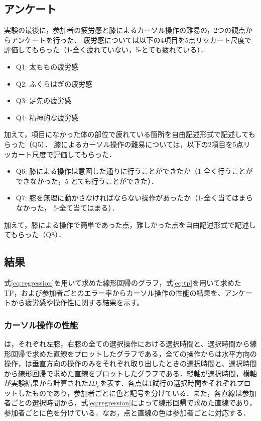 \documentclass[submit, techrep]{ipsj}
\begin{document}
\subsection{アンケート}
実験の最後に，参加者の疲労感と膝によるカーソル操作の難易の，2つの観点からアンケートを行った．
疲労感については以下の4項目を5点リッカート尺度で評価してもらった（1-全く疲れていない，5-とても疲れている）．
\begin{itemize}
	\item {Q1: }太ももの疲労感
	\item {Q2: }ふくらはぎの疲労感
	\item {Q3: }足先の疲労感
	\item {Q4: }精神的な疲労感
\end{itemize}
加えて，項目になかった体の部位で疲れている箇所を自由記述形式で記述してもらった（Q5）．
膝によるカーソル操作の難易については，以下の2項目を5点リッカート尺度で評価してもらった．
\begin{itemize}
	\item {Q6: }膝による操作は意図した通りに行うことができたか（1-全く行うことができなかった，5-とても行うことができた）．
	\item {Q7: }膝を無理に動かさなければならない操作があったか（1-全く当てはまらなかった， 5-全て当てはまる）．
\end{itemize}
加えて，膝による操作で簡単であった点，難しかった点を自由記述形式で記述してもらった（Q8）．
\subsection{結果}
式\ref{eq:regression}を用いて求めた線形回帰のグラフ，式\ref{eq:tp}を用いて求めたTP，および参加者ごとのエラー率からカーソル操作の性能の結果を、アンケートから疲労感や操作性に関する結果を示す。
\subsubsection{カーソル操作の性能}
は，それぞれ左膝，右膝の全ての選択操作における選択時間と、選択時間から線形回帰で求めた直線をプロットしたグラフである，全ての操作からは水平方向の操作，は垂直方向の操作のみをそれぞれ取り出したときの選択時間と、選択時間から線形回帰で求めた直線をプロットしたグラフである．縦軸が選択時間，横軸が実験結果から計算された$ID_e$を表す．各点は1試行の選択時間をそれぞれプロットしたものであり，参加者ごとに色と記号を分けている．また，各直線は参加者ごとの選択時間から，式\ref{eq:regression}によって線形回帰で求めた直線であり，参加者ごとに色を分けている．なお，点と直線の色は参加者ごとに対応する．
\end{document}
